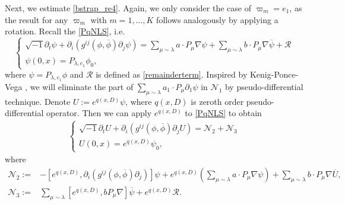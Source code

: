 \documentclass[10pt,twoside,a4paper]{article}
\numberwithin{equation}{section}\allowdisplaybreaks
\begin{document}
Next, we estimate \eqref{bstrap_re4}. Again, we only consider the case of \( \varpi_m=e_1 \), as the result for any \( \varpi_m \) with \( m = 1, \dots, K \) follows analogously by applying a rotation.
Recall  the \eqref{PqNLS}, i.e.
\begin{equation*}  
	\begin{cases}
		\sqrt{-1}  \partial_t \psi + \partial_i\left( g^{ij}\left(\phi,\overline{\phi}\right) \partial_j \psi \right)=\sum_{\mu\sim \lambda} a \cdot      P_\mu \nabla \psi + \sum_{\mu\sim \lambda} b\cdot     P_\mu \nabla\overline{ \psi }+\mathcal{R}\\
		\psi (0,x)= P_{\lambda, e_1 } \phi_0 ,
	\end{cases}
\end{equation*}
where $\psi=P_{\lambda, e_1}  \phi $ and  $\mathcal{R} $ is defined as \eqref{remainderterm}.
Inspired by Kenig-Ponce-Vega \cite{kenig2004cauchy}, we will eliminate the part of $ \sum_{\mu\sim \lambda} a_1 \cdot P_\mu \partial_1 \psi $  in $ \mathcal{N}_1 $  by pseudo-differential technique.
Denote $ U:= e^{q (x,D)} \psi $, where $ q (x,D)$ is zeroth order pseudo-differential operator.
Then we  can apply  $e^{q (x,D)} $ to \eqref{PqNLS} to obtain 
\begin{align} \label{eq_U}
	\begin{cases}
		\sqrt{-1}  \partial_t U + \partial_i\left( g^{ij}\left(\phi,\overline{\phi}\right) \partial_j U \right)=\mathcal{N}_2+\mathcal{N}_3\\
		U (0,x)=e^{q (x,D)} \psi_0 ,
	\end{cases}
\end{align}
where 
\begin{align*}
	\mathcal{N}_2:= &-[e^{q (x,D)}, \partial_i  (g^{ij}\left(\phi,\overline{\phi}\right) \partial_j)] \psi + e^{q (x,D)} \left(\sum_{\mu\sim \lambda} a \cdot P_\mu \nabla \psi \right)+ \sum_{\mu\sim \lambda} b\cdot  P_\mu \nabla \overline{U},\\
	\mathcal{N}_3:=& \sum_{\mu\sim \lambda}  [e^{q (x,D)}, b  P_\mu \nabla] \overline{\psi}+ e^{q (x,D)} \mathcal{R}  .
\end{align*}
\end{document}
